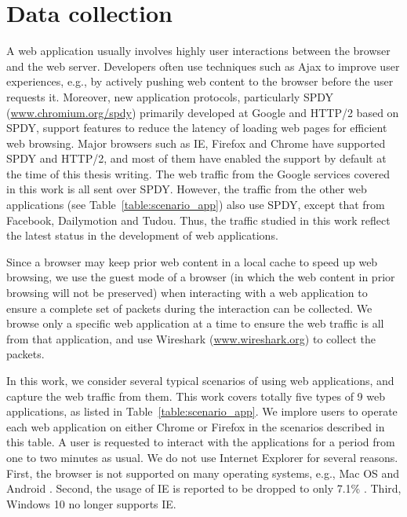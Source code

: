 \section{Data collection}
\label{sec:collect}

A web application usually involves highly user interactions between the browser and the web server. Developers often use techniques such as Ajax to improve user experiences, e.g., by actively pushing web content to the browser before the user requests it. Moreover, new application protocols, particularly SPDY (\url{www.chromium.org/spdy}) primarily developed at Google and HTTP/2 based on SPDY, support features to reduce the latency of loading web pages for efficient web browsing. Major browsers such as IE, Firefox and Chrome have supported SPDY and HTTP/2, and most of them have enabled the support by default at the time of this thesis writing. The web traffic from the Google services covered in this work is all sent over SPDY. However, the traffic  from the other web applications (see Table~\ref{table:scenario_app}) also use SPDY, except that from Facebook, Dailymotion and Tudou. Thus, the traffic studied in this work reflect the latest status in the development of web applications.  

Since a browser may keep prior web content in a local cache to speed up web browsing, we use the guest mode of a browser (in which the web content in prior browsing will not be preserved) when interacting with a web application to ensure a complete set of packets during the interaction can be collected. We browse only a specific web application at a time to ensure the web traffic is all from that application, and use Wireshark (\url{www.wireshark.org}) to collect the packets. 

In this work, we consider several typical scenarios of using web applications, and capture the web traffic from them. This work covers totally five types of 9 web applications, as listed in Table~\ref{table:scenario_app}. We implore users to operate each web application on either Chrome or Firefox in the scenarios described in this table. A user is requested to interact with the applications for a period from one to two minutes as usual. We do not use Internet Explorer for several reasons. First, the browser is not supported on many operating systems, e.g., Mac OS and Android \cite{IBR}. Second, the usage of IE is reported to be dropped to only 7.1\% \cite{BS}. Third, Windows 10 no longer supports IE. 



